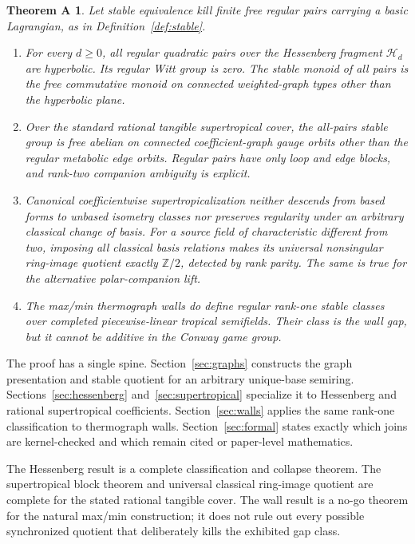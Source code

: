 \documentclass[11pt]{article}
\newtheorem*{thmA}{Theorem A}
\theoremstyle{definition}
\theoremstyle{remark}
\newcommand{\Hess}{\mathcal H}
\begin{document}
\begin{thmA}
Let stable equivalence kill finite free regular pairs carrying a basic
Lagrangian, as in Definition~\ref{def:stable}.
\begin{enumerate}
\item For every \(d\ge0\), all regular quadratic pairs over the Hessenberg
fragment \(\Hess_d\) are hyperbolic.  Its regular Witt group is zero.  The
stable monoid of all pairs is the free commutative monoid on connected
weighted-graph types other than the hyperbolic plane.
\item Over the standard rational tangible supertropical cover, the all-pairs
stable group is free abelian on connected coefficient-graph gauge orbits
other than the regular metabolic edge orbits.  Regular pairs have only loop
and edge blocks, and rank-two companion ambiguity is explicit.
\item Canonical coefficientwise supertropicalization neither descends from
based forms to unbased isometry classes nor preserves regularity under an
arbitrary classical change of basis.  For a source field of characteristic
different from two, imposing all classical basis relations makes its
universal nonsingular ring-image quotient exactly
\(\mathbb Z/2\), detected by rank parity.  The same is true for the alternative
polar-companion lift.
\item The max/min thermograph walls do define regular rank-one stable classes
over completed piecewise-linear tropical semifields.  Their class is the wall
gap, but it cannot be additive in the Conway game group.
\end{enumerate}
\end{thmA}

The proof has a single spine.  Section~\ref{sec:graphs} constructs the graph
presentation and stable quotient for an arbitrary unique-base semiring.
Sections~\ref{sec:hessenberg} and~\ref{sec:supertropical} specialize it to
Hessenberg and rational supertropical coefficients.
Section~\ref{sec:walls} applies the same rank-one classification to
thermograph walls.  Section~\ref{sec:formal} states exactly which joins are
kernel-checked and which remain cited or paper-level mathematics.

The Hessenberg result is a complete classification and collapse theorem.  The
supertropical block theorem and universal classical ring-image quotient are
complete for the stated rational tangible cover.  The wall result is a no-go
theorem for the natural max/min construction; it does not rule out every
possible synchronized quotient that deliberately kills the exhibited gap
class.
\end{document}
